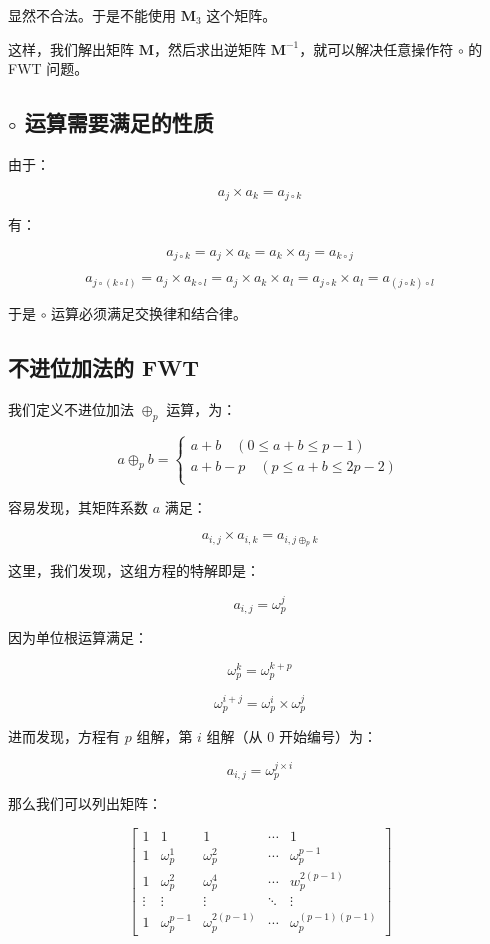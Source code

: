 \documentclass{article}
\begin{document}
显然不合法。于是不能使用 $\mathbf{M}_3$ 这个矩阵。

这样，我们解出矩阵 $\mathbf{M}$，然后求出逆矩阵 $\mathbf{M}^{-1}$，就可以解决任意操作符 $\circ$ 的 FWT 问题。

\subsection{$\circ$ 运算需要满足的性质}

由于：

$$a_{j} \times a_{k}=a_{j \circ k}$$

有：

$$
a_{j \circ k}=a_j \times a_k=a_k \times a_j=a_{k \circ j}
$$

$$
a_{j \circ (k \circ l)}=a_j \times a_{k \circ l}=a_j \times a_k \times a_l=a_{j \circ k} \times a_{l}=a_{(j \circ k)\circ l}
$$

于是 $\circ$ 运算必须满足交换律和结合律。

\subsection{不进位加法的 FWT}

我们定义不进位加法 $\oplus_p$ 运算，为：

$$
a \oplus_p b  =
\left\{
    \begin{array}{l}
        a+b \quad (0 \le a+b \le p-1) \\
        a+b-p \quad (p \le a+b \le 2p-2) \\
    \end{array}
\right.
$$

容易发现，其矩阵系数 $a$ 满足：

$$a_{i,j} \times a_{i,k}=a_{i,j \oplus_p k}$$

这里，我们发现，这组方程的特解即是：

$$a_{i,j} = \omega_{p}^j$$

因为单位根运算满足：

$$\omega_{p}^k = \omega_{p}^{k+p}$$

$$\omega_{p}^{i+j} = \omega_{p}^i \times \omega_{p}^j$$

进而发现，方程有 $p$ 组解，第 $i$ 组解（从 $0$ 开始编号）为：

$$a_{i,j} = \omega_{p}^{j \times i}$$

那么我们可以列出矩阵：

$$
\begin{bmatrix} 1& 1 & 1& \cdots & 1\\ 1& \omega_p^1& \omega_p^2& \cdots & \omega_p^{p - 1}\\ 1& \omega_p^2 & \omega_p^4& \cdots & w_p^{2(p - 1)}\\ \vdots& \vdots& \vdots& \ddots& \vdots\\ 1& \omega_p^{p - 1}& \omega_p^{2(p - 1)} & \cdots & \omega_p^{(p - 1)(p - 1)} \end{bmatrix}
$$
\end{document}
